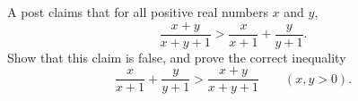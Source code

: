 A post claims that for all positive real numbers $x$ and $y$,
\[
\dfrac{x+y}{x+y+1}>\dfrac{x}{x+1}+\dfrac{y}{y+1}.
\]
Show that this claim is false, and prove the correct inequality
\[
\dfrac{x}{x+1}+\dfrac{y}{y+1}>\dfrac{x+y}{x+y+1}\qquad(x,y>0).
\]
